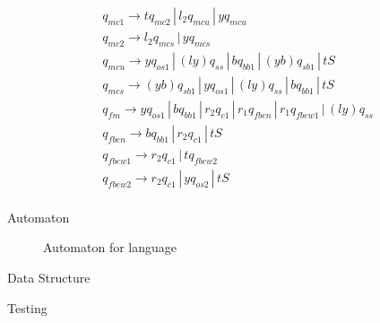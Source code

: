 \documentclass{article}
\begin{document}
\begin{mylist}
\begin{align*}
&q_{mc1} \rightarrow tq_{mc2} \, | \, l_2q_{mcu} \, | \, yq_{mcu}\\
&q_{mc2} \rightarrow l_2q_{mcs} \, | \, yq_{mcs}\\
&q_{mcu} \rightarrow yq_{os1} \, | \, (ly)q_{ss} \, | \, bq_{bb1} \, | \, (yb)q_{sb1} \, | \,tS\\
&q_{mcs} \rightarrow (yb)q_{sb1} \, | \, yq_{os1} \, | \, (ly)q_{ss} \, | \, bq_{bb1}\, | \,tS\\
&q_{fm} \rightarrow yq_{os1} \, | \, bq_{bb1} \, | \, r_2q_{c1} \, | \, r_1q_{fben} \, | \, r_1q_{fbew1} \, | \, (ly)q_{ss}\\
&q_{fben} \rightarrow bq_{bb1} \, | \, r_2q_{c1} \, | \, tS\\
&q_{fbew1} \rightarrow r_2q_{c1} \, | \, tq_{fbew2} \\
&q_{fbew2} \rightarrow r_2q_{c1} \, | \, yq_{os2} \, | \, tS\\
\end{align*}

\item Automaton

\begin{center}

\begin{figure}[ht]
    \centering
    \caption{Automaton for language}
    \label{fig1:automaton-for-language}
\end{figure}

\end{center}

\newpage
\item Data Structure

\item Testing

\end{mylist}
\end{document}
